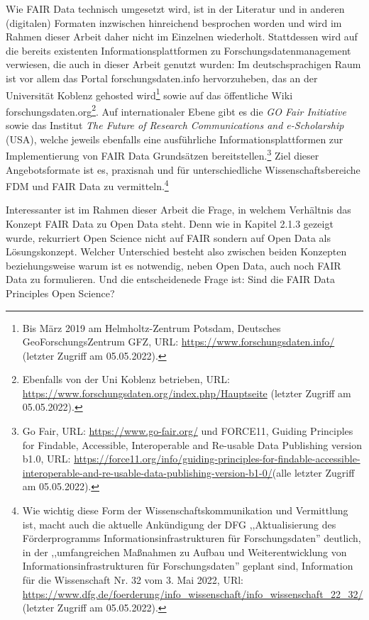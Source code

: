 Wie FAIR Data technisch umgesetzt wird, ist in der Literatur und in anderen (digitalen) Formaten inzwischen hinreichend besprochen worden und wird im Rahmen dieser Arbeit daher nicht im Einzelnen wiederholt. Stattdessen wird auf die bereits existenten Informationsplattformen zu Forschungsdatenmanagement verwiesen, die auch in dieser Arbeit genutzt wurden: Im deutschsprachigen Raum ist vor allem das Portal forschungsdaten.info hervorzuheben, das an der Universität Koblenz gehosted wird\footnote{Bis März 2019 am Helmholtz-Zentrum Potsdam, Deutsches GeoForschungsZentrum GFZ, URL: \url{https://www.forschungsdaten.info/} (letzter Zugriff am 05.05.2022).} sowie auf das öffentliche Wiki forschungsdaten.org\footnote{Ebenfalls von der Uni Koblenz betrieben, URL: \url{https://www.forschungsdaten.org/index.php/Hauptseite} (letzter Zugriff am 05.05.2022).}. Auf internationaler Ebene gibt es die \textit{GO Fair Initiative} sowie das Institut \textit{The Future of Research Communications and e-Scholarship} (USA), welche jeweils ebenfalls eine ausführliche Informationsplattformen zur Implementierung von FAIR Data Grundsätzen bereitstellen.\footnote{Go Fair, URL: \url{https://www.go-fair.org/} und FORCE11, Guiding Principles for Findable, Accessible, Interoperable and Re-usable Data Publishing version b1.0, URL: \url{https://force11.org/info/guiding-principles-for-findable-accessible-interoperable-and-re-usable-data-publishing-version-b1-0/}(alle letzter Zugriff am 05.05.2022).} Ziel dieser Angebotsformate ist es, praxisnah und für unterschiedliche Wissenschaftsbereiche FDM und FAIR Data zu vermitteln.\footnote{Wie wichtig diese Form der Wissenschaftskommunikation und Vermittlung ist, macht auch die aktuelle Ankündigung der DFG ,,Aktualisierung des Förderprogramms Informationsinfrastrukturen für Forschungsdaten'' deutlich, in der ,,umfangreichen Maßnahmen zu Aufbau und Weiterentwicklung von Informationsinfrastrukturen für Forschungsdaten'' geplant sind, Information für die Wissenschaft Nr. 32 vom 3. Mai 2022, URl: \url{https://www.dfg.de/foerderung/info_wissenschaft/info_wissenschaft_22_32/} (letzter Zugriff am 05.05.2022).}

Interessanter ist im Rahmen dieser Arbeit die Frage, in welchem Verhältnis das Konzept FAIR Data zu Open Data steht. Denn wie in Kapitel 2.1.3 gezeigt wurde, rekurriert Open Science nicht auf FAIR sondern auf Open Data als Lösungskonzept. Welcher Unterschied besteht also zwischen beiden Konzepten beziehungsweise warum ist es notwendig, neben Open Data, auch noch FAIR Data zu formulieren. Und die entscheidenede Frage ist: Sind die FAIR Data Principles Open Science? 

